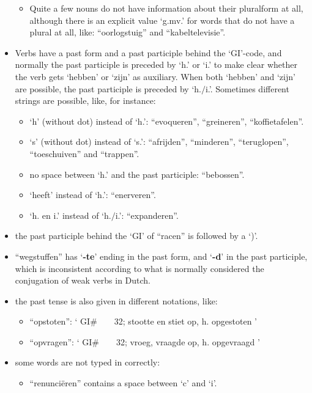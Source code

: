 \begin{itemize}
\begin{itemize}
       \item Quite a few nouns do not have information about their pluralform
             at all, although there is an explicit 
             value `g.mv.' for words that do not have a plural at all, like:
             ``oorlogstuig'' and ``kabeltelevisie''.
     \end{itemize}
  \item Verbs have a past form and a past participle behind the `GI'-code, and
        normally the past participle is preceded by `h.' or `i.' to make clear
        whether the verb gets `hebben' or `zijn' as auxiliary. When both
        `hebben' and `zijn' are possible, the past participle is preceded by
        `h.$/$i.'. Sometimes different strings are possible, like, for instance:
     \begin{itemize}
        \item `h' (without dot) instead of `h.': ``evoqueren'', ``greineren'',
              ``koffietafelen''.
        \item `s' (without dot) instead of `s.': ``afrijden'', ``minderen'',
              ``teruglopen'', ``toeschuiven'' and ``trappen''.
        \item no space between `h.' and the past participle: ``bebossen''.
        \item `heeft' instead of `h.': ``enerveren''.
        \item `h. en i.' instead of `h.$/$i.': ``expanderen''.
     \end{itemize}
  \item the past participle behind the `GI' of ``racen'' is followed by a `)'.
  \item ``wegstuffen'' has `{\bf -te}' ending in the past form, and `{\bf -d}' 
        in the past participle, which is inconsistent according to what is 
        normally considered the conjugation of weak verbs in Dutch.
  \item the past tense is also given in different notations, like:
     \begin{itemize}
      \item ``opstoten'': ` GI\#\ \ \ \ 32; stootte en stiet op, h. opgestoten '
      \item ``opvragen'': ` GI\#\ \ \ \ 32; vroeg, vraagde op, h. opgevraagd '
     \end{itemize}
  \item some words are not typed in correctly:
     \begin{itemize}
        \item ``renunci\"{e}ren'' contains a space between `c' and `i'.

\end{itemize}
\end{itemize}
